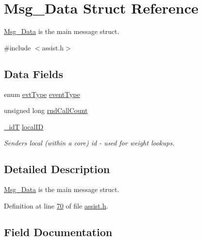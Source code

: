 \hypertarget{struct_msg___data}{}\section{Msg\+\_\+\+Data Struct Reference}
\label{struct_msg___data}


\hyperlink{struct_msg___data}{Msg\+\_\+\+Data} is the main message struct.  




{\ttfamily \#include $<$assist.\+h$>$}

\subsection*{Data Fields}
\begin{DoxyCompactItemize}
\item 
enum \hyperlink{assist_8h_a7c1688de451e0dea1e11617bce3ec450}{evt\+Type} \hyperlink{struct_msg___data_a015b6eb45982e1842ee8fc389a099ced}{event\+Type}
\item 
unsigned long \hyperlink{struct_msg___data_a2e49a6bcc6c45ade722f746b1ea707f2}{rnd\+Call\+Count}
\item 
\hyperlink{assist_8h_a3f7a6e6a1210b6d9d7a42177dcb9634b}{\+\_\+id\+T} \hyperlink{struct_msg___data_aefc820e92a74047ec7ed74c1c45f818f}{local\+I\+D}
\begin{DoxyCompactList}\small\item\em Sender\textquotesingle{}s local (within a core) id -\/ used for weight lookups. \end{DoxyCompactList}\end{DoxyCompactItemize}


\subsection{Detailed Description}
\hyperlink{struct_msg___data}{Msg\+\_\+\+Data} is the main message struct. 

Definition at line \hyperlink{assist_8h_source_l00070}{70} of file \hyperlink{assist_8h_source}{assist.\+h}.



\subsection{Field Documentation}
\hypertarget{struct_msg___data_a015b6eb45982e1842ee8fc389a099ced}{}
